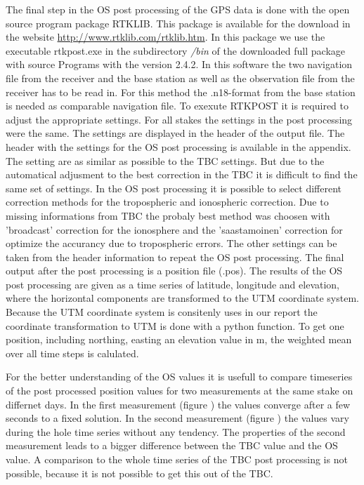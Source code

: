 The final step in the OS post processing of the GPS data is done with the open source program package RTKLIB.
This package is available for the download in the website \url{http://www.rtklib.com/rtklib.htm}.
In this package we use the executable rtkpost.exe in the subdirectory \textit{/bin} of the downloaded full package with source Programs with the version 2.4.2.
In this software the two navigation file from the receiver and the base station as well as the observation file from the receiver has to be read in.
For this method the .n18-format from the base station is needed as comparable navigation file. 
To exexute RTKPOST it is required to adjust the appropriate settings.
For all stakes the settings in the post processing were the same.
The settings are displayed in the header of the output file.
The header with the settings for the OS post processing is available in the appendix.
The setting are as similar as possible to the TBC settings.
But due to the automatical adjusment to the best correction in the TBC it is difficult to find the same set of settings.
In the OS post processing it is possible to select different correction methods for the tropospheric and ionospheric correction. 
Due to missing informations from TBC the probaly best method was choosen with 'broadcast' correction for the ionosphere and the 'saastamoinen' correction for optimize the accurancy due to tropospheric errors. 
The other settings can be taken from the header information to repeat the OS post processing. 
The final output after the post processing is a position file (.pos). 
The results of the OS post processing are given as a time series of latitude, longitude and elevation, where the horizontal components are transformed to the UTM coordinate system. 
Because the UTM coordinate system is consitenly uses in our report the coordinate transformation to UTM is done with a python function.
To get one position, including northing, easting an elevation value in m, the weighted mean over all time steps is calulated.
\medskip

For the better understanding of the OS values it is usefull to compare timeseries of the post processed position values for two measurements at the same stake on differnet days.
In the first measurement (figure \label{GPS:fig:T1-i_timeseries}) the values converge after a few seconds to a fixed solution.
In the second measurement (figure \label{GPS:fig:T1-ii_timeseries}) the values vary during the hole time series without any tendency.
The properties of the second measurement leads to a bigger difference between the TBC value and the OS value.
A comparison to the whole time series of the TBC post processing is not possible, because it is not possible to get this out of the TBC.

